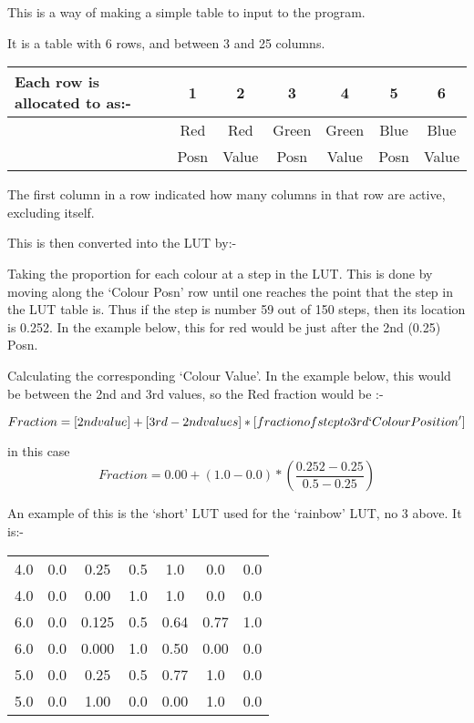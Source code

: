 {{  This is a way of making a simple table to input to the program.
                                                                               
  It is a table with 6 rows, and between 3 and 25 columns.
             
\begin{tabular}{|l|c|c|c|c|c|c|} \hline                                                                  
  Each row is allocated to as:- &  1      &2      &3       &4     &5      &6 \\ \hline
                               &  Red &  Red  & Green &  Green&   Blue &  Blue \\
                               & Posn & Value &  Posn &  Value &  Posn & Value \\ \hline
\end{tabular}
                                                                               
  The first column in a row indicated how many columns in that row are
  active, excluding itself.
                                                                               
  This is then converted into the LUT by:-
                                                                               
  Taking the proportion for each colour at a step in the LUT. This
     is done by moving along the `Colour Posn' row until one reaches
     the point that the step in the LUT table is. Thus if the step is
     number 59 out of 150 steps, then its location is 0.252. In the
     example below, this for red would be just after the 2nd (0.25)
     Posn.

   Calculating the corresponding `Colour Value'. In the example below,
     this would be between the 2nd and 3rd values, so the Red fraction
     would be :-

$$     Fraction = [2nd value] + [3rd-2nd values]*[fraction of step to 3rd `Colour Position'] $$

in this case
$$     Fraction = 0.00 + (1.0-0.0)*(\frac{0.252-0.25}{0.5-0.25}) $$
                                                                               
  An example of this is the `short' LUT used for the `rainbow' LUT, no 3
  above. It is:-

\begin{tabular}{ccccccc}                                                                               
     4.0& 0.0& 0.25&  0.5&  1.0&  0.0& 0.0 \\
     4.0& 0.0& 0.00&  1.0&  1.0&  0.0& 0.0 \\
     6.0& 0.0& 0.125& 0.5& 0.64& 0.77& 1.0 \\
     6.0& 0.0& 0.000& 1.0& 0.50& 0.00& 0.0 \\
     5.0& 0.0& 0.25&  0.5& 0.77&  1.0& 0.0 \\
     5.0& 0.0& 1.00&  0.0& 0.00&  1.0& 0.0 \\
\end{tabular}
                                                                               
}}
